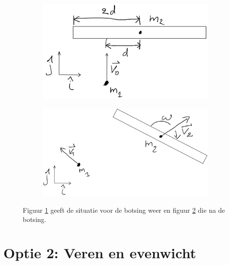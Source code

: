 \documentclass[a4paper,11pt]{article}
\begin{document}
\begin{figure}[H]
	\centering
	\begin{subfigure}[b]{0.45\textwidth}
		\centering
		\includegraphics[width=\textwidth]{VoorBotsing}
		\caption{}
		\label{fig:VoorBotsing}
	\end{subfigure}
	\hfill
	\begin{subfigure}[b]{0.45\textwidth}
		\centering
		\includegraphics[width=\textwidth]{NaBotsing}
		\caption{}
		\label{fig:NaBotsing}
	\end{subfigure}
	\caption{Figuur \ref{fig:VoorBotsing} geeft de situatie voor de botsing weer en figuur \ref{fig:NaBotsing} die na de botsing.}
	\label{fig:Botsing}
\end{figure}


\newpage 
\section*{Optie 2: Veren en evenwicht}
\end{document}
